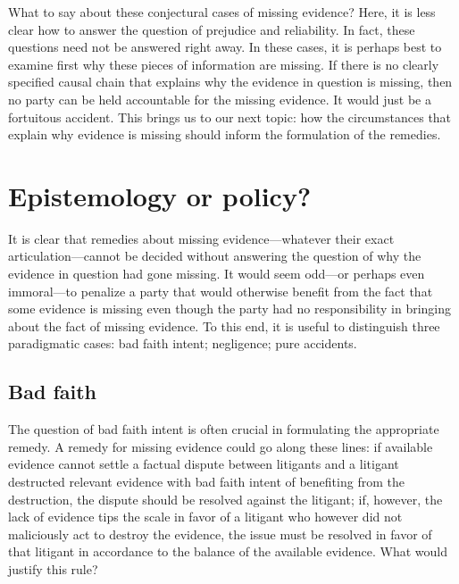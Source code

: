 \documentclass[
  10pt,
  dvipsnames,enabledeprecatedfontcommands]{scrartcl}
\begin{document}
What to say about these conjectural cases of missing evidence? Here, it
is less clear how to answer the question of prejudice and reliability.
In fact, these questions need not be answered right away. In these
cases, it is perhaps best to examine first why these pieces of
information are missing. If there is no clearly specified causal chain
that explains why the evidence in question is missing, then no party can
be held accountable for the missing evidence. It would just be a
fortuitous accident. This brings us to our next topic: how the
circumstances that explain why evidence is missing should inform the
formulation of the remedies.

\hypertarget{epistemology-or-policy}{%
\section{Epistemology or policy?}\label{epistemology-or-policy}}

It is clear that remedies about missing evidence---whatever their exact
articulation---cannot be decided without answering the question of why
the evidence in question had gone missing. It would seem odd---or
perhaps even immoral---to penalize a party that would otherwise benefit
from the fact that some evidence is missing even though the party had no
responsibility in bringing about the fact of missing evidence. To this
end, it is useful to distinguish three paradigmatic cases: bad faith
intent; negligence; pure accidents.

\hypertarget{bad-faith}{%
\subsection{Bad faith}\label{bad-faith}}

The question of bad faith intent is often crucial in formulating the
appropriate remedy. A remedy for missing evidence could go along these
lines: if available evidence cannot settle a factual dispute between
litigants and a litigant destructed relevant evidence with bad faith
intent of benefiting from the destruction, the dispute should be
resolved against the litigant; if, however, the lack of evidence tips
the scale in favor of a litigant who however did not maliciously act to
destroy the evidence, the issue must be resolved in favor of that
litigant in accordance to the balance of the available evidence. What
would justify this rule?
\end{document}
